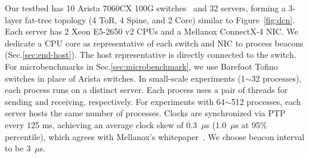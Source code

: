 Our testbed has 10 Arista 7060CX 100G switches~\cite{arista} and 32 servers, forming a 3-layer fat-tree topology (4 ToR, 4 Spine, and 2 Core) similar to Figure~\ref{fig:dcn}.
Each server has 2 Xeon E5-2650 v2 CPUs and a Mellanox ConnectX-4 NIC. %
We dedicate a CPU core as representative of each switch and NIC to process beacons (Sec.\ref{sec:end-host}). The host representative is directly connected to the switch. %
For microbenchmarks in Sec.\ref{sec:microbenchmark}, we use Barefoot Tofino~\cite{tofino} switches in place of Arista switches.
In small-scale experiments (1$\sim$32 processes), each process runs on a distinct server. Each process uses a pair of threads for sending and receiving, respectively.
For experiments with 64$\sim$512 processes, each server hosts the same number of processes.
Clocks are synchronized via PTP~\cite{correll2005design} every 125 ms, achieving an average clock skew of 0.3~$\mu$s (1.0~$\mu$s at 95\% percentile), which agrees with Mellanox's whitepaper~\cite{mellanox-ptp}.
We choose beacon interval to be 3~$\mu$s.


\iffalse
\begin{table}[t]
\centering
{}
\caption{Network topologies for evaluation.}
\label{tab:eval-topology}
\end{table}

